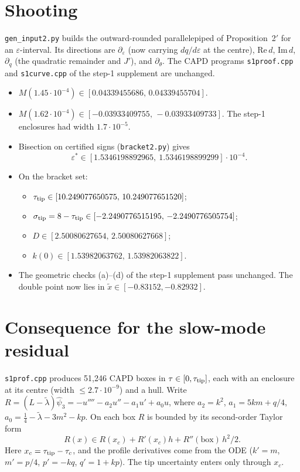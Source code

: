 \documentclass[11pt]{amsart}
\theoremstyle{remark}
\newcommand{\eps}{\varepsilon}
\begin{document}
\section{Shooting}
\texttt{gen\_input2.py} builds the outward-rounded parallelepiped of Proposition~2$'$ for an $\eps$-interval. Its directions are $\partial_\eps$ (now carrying $dq/d\eps$ at the centre), $\mathrm{Re}\,d$, $\mathrm{Im}\,d$, $\partial_q$ (the quadratic remainder and $J'$), and $\partial_\theta$. The CAPD programs \texttt{s1proof.cpp} and \texttt{s1curve.cpp} of the step-1 supplement are unchanged.
\begin{itemize}
\item $M(1.45\cdot10^{-4})\in[0.04339455686,\,0.04339455704]$.
\item $M(1.62\cdot10^{-4})\in[-0.03933409755,\,-0.03933409733]$. The step-1 enclosures had width $1.7\cdot10^{-5}$.
\item Bisection on certified signs (\texttt{bracket2.py}) gives
\[\eps^*\in[1.5346198892965,\ 1.5346198899299]\cdot10^{-4}.\]
\item On the bracket set:
  \begin{itemize}
  \item $\tau_{\rm tip}\in[10.249077650575,\,10.249077651520]$;
  \item $\sigma_{\rm tip}=8-\tau_{\rm tip}\in[-2.2490776515195,\,-2.2490776505754]$;
  \item $D\in[2.50080627654,\,2.50080627668]$;
  \item $k(0)\in[1.53982063762,\,1.53982063822]$.
  \end{itemize}
\item The geometric checks (a)--(d) of the step-1 supplement pass unchanged. The double point now lies in $\tilde x\in[-0.83152,-0.82932]$.
\end{itemize}

\section{Consequence for the slow-mode residual}
\texttt{s1prof.cpp} produces 51{,}246 CAPD boxes in $\tau\in[0,\tau_{\rm tip}]$, each with an enclosure at its centre (width $\le2.7\cdot10^{-9}$) and a hull. Write $R=(L-\tilde\lambda)\hat\psi_3=-u''''-a_2u''-a_1u'+a_0u$, where $a_2=k^2$, $a_1=5km+q/4$, $a_0=\frac14-\tilde\lambda-3m^2-kp$. On each box $R$ is bounded by its second-order Taylor form
\[
R(x)\in R(x_c)+R'(x_c)h+R''(\mathrm{box})\,h^2/2 .
\]
Here $x_c=\tau_{\rm tip}-\tau_c$, and the profile derivatives come from the ODE ($k'=m$, $m'=p/4$, $p'=-kq$, $q'=1+kp$). The tip uncertainty enters only through $x_c$.
\end{document}

